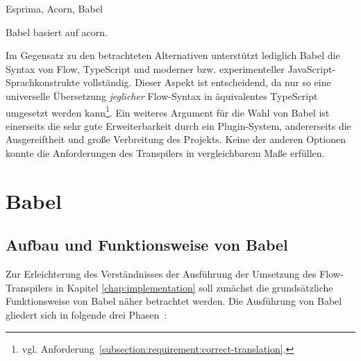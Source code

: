 Esprima, Acorn, Babel

Babel basiert auf acorn.


Im Gegensatz zu den betrachteten Alternativen unterstützt lediglich Babel die Syntax von Flow, TypeScript und moderner bzw. experimenteller JavaScript-Sprachkonstrukte vollständig. Dieser Aspekt ist entscheidend, da nur so eine universelle Übersetzung \emph{jeglicher} Flow-Syntax in äquivalentes TypeScript umgesetzt werden kann\footnote{vgl. Anforderung~\ref{subsection:requirement:correct-translation}.}. Ein weiteres Argument für die Wahl von Babel ist einerseits die sehr gute Erweiterbarkeit durch ein Plugin-System, andererseits die Ausgereiftheit und große Verbreitung des Projekts. Keine der anderen Optionen konnte die Anforderungen des Transpilers in vergleichbarem Maße erfüllen.

\section{Babel}
\label{sec:babel}

\subsection{Aufbau und Funktionsweise von Babel}

Zur Erleichterung des Verständnisses der Ausführung der Umsetzung des Flow-Transpilers in Kapitel \ref{chap:implementation} soll zunächst die grundsätzliche Funktionsweise von Babel näher betrachtet werden. Die Ausführung von Babel gliedert sich in folgende drei Phasen~\autocite{BABEL_HANDBOOK}:

